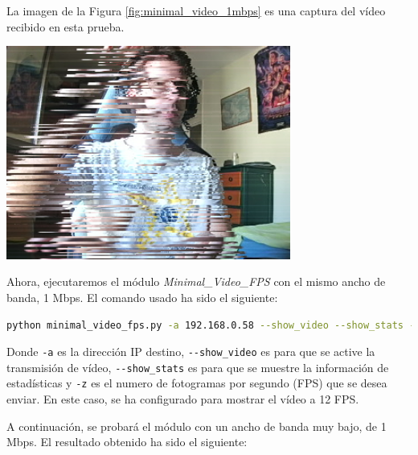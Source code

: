 La imagen de la Figura \ref{fig:minimal_video_1mbps} es una captura del vídeo recibido en esta prueba.
\begin{center}
  \includegraphics[width = 0.7\textwidth]{images/VideoRecibido1.1.png}
  \label{fig:minimal_video_1mbps}
\end{center}

\newpage

\vspace{\baselineskip}

Ahora, ejecutaremos el módulo \textit{Minimal\_Video\_FPS} con el mismo ancho de banda, 1 Mbps. El comando usado ha sido el siguiente:

\begin{lstlisting}[language=bash, basicstyle=\ttfamily\scriptsize]
    python minimal_video_fps.py -a 192.168.0.58 --show_video --show_stats -z 12
\end{lstlisting}

Donde \verb|-a| es la dirección IP destino, \verb|--show_video| es para que se active la transmisión de vídeo, \verb|--show_stats| es para que se muestre la información de estadísticas y \verb|-z| es el numero de fotogramas por segundo (FPS) que se desea enviar. En este caso, se ha configurado para mostrar el vídeo a 12 FPS.

A continuación, se probará el módulo con un ancho de banda muy bajo, de 1 Mbps. El resultado obtenido ha sido el siguiente:
\vspace{\baselineskip}

